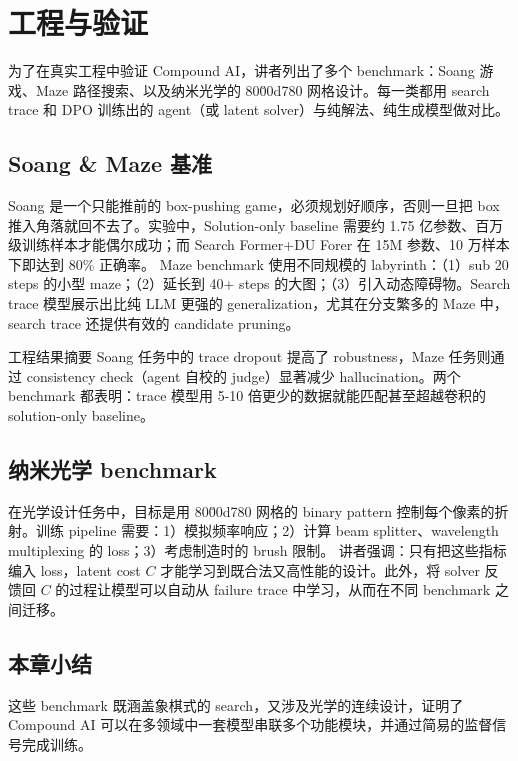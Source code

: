 \section{工程与验证}

为了在真实工程中验证 Compound AI，讲者列出了多个 benchmark：Soang 游戏、Maze 路径搜索、以及纳米光学的 80\u00d780 网格设计。每一类都用 search trace 和 DPO 训练出的 agent（或 latent solver）与纯解法、纯生成模型做对比。

\subsection{Soang \& Maze 基准}

Soang 是一个只能推前的 box-pushing game，必须规划好顺序，否则一旦把 box 推入角落就回不去了。实验中，Solution-only baseline 需要约 1.75 亿参数、百万级训练样本才能偶尔成功；而 Search Former+DU Forer 在 15M 参数、10 万样本下即达到 80\% 正确率。
Maze benchmark 使用不同规模的 labyrinth：（1）sub 20 steps 的小型 maze；（2）延长到 40+ steps 的大图；（3）引入动态障碍物。Search trace 模型展示出比纯 LLM 更强的 generalization，尤其在分支繁多的 Maze 中，search trace 还提供有效的 candidate pruning。
\begin{knowledgebox}{工程结果摘要}
Soang 任务中的 trace dropout 提高了 robustness，Maze 任务则通过 consistency check（agent 自校的 judge）显著减少 hallucination。两个 benchmark 都表明：trace 模型用 5-10 倍更少的数据就能匹配甚至超越卷积的 solution-only baseline。
\end{knowledgebox}

\subsection{纳米光学 benchmark}

在光学设计任务中，目标是用 80\u00d780 网格的 binary pattern 控制每个像素的折射。训练 pipeline 需要：1）模拟频率响应；2）计算 beam splitter、wavelength multiplexing 的 loss；3）考虑制造时的 brush 限制。
讲者强调：只有把这些指标编入 loss，latent cost \(C\) 才能学习到既合法又高性能的设计。此外，将 solver 反馈回 \(C\) 的过程让模型可以自动从 failure trace 中学习，从而在不同 benchmark 之间迁移。

\subsection{本章小结}

这些 benchmark 既涵盖象棋式的 search，又涉及光学的连续设计，证明了 Compound AI 可以在多领域中一套模型串联多个功能模块，并通过简易的监督信号完成训练。

